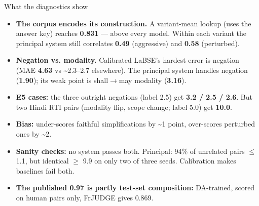 \documentclass[aspectratio=169,11pt]{beamer}
\begin{document}
\begin{frame}{What the diagnostics show}
\footnotesize
\begin{itemize}
\item \textbf{The corpus encodes its construction.} A variant-mean lookup (uses the answer key) reaches \textbf{0.831} — above every model. Within each variant the principal system still correlates \textbf{0.49} (aggressive) and \textbf{0.58} (perturbed).
\item \textbf{Negation vs. modality.} Calibrated LaBSE's hardest error is negation (MAE \textbf{4.63} vs \textasciitilde{}2.3–2.7 elsewhere). The principal system handles negation (\textbf{1.90}); its weak point is shall\ensuremath{\rightarrow}may modality (\textbf{3.16}).
\item \textbf{E5 cases:} the three outright negations (label 2.5) get \textbf{3.2 / 2.5 / 2.6}. But two Hindi RTI pairs (modality flip, scope change; label 5.0) get \textbf{10.0}.
\item \textbf{Bias:} under-scores faithful simplifications by \textasciitilde{}1 point, over-scores perturbed ones by \textasciitilde{}2.
\item \textbf{Sanity checks:} no system passes both. Principal: 94\% of unrelated pairs \ensuremath{\leq} 1.1, but identical \ensuremath{\geq} 9.9 on only two of three seeds. Calibration makes baselines fail both.
\item \textbf{The published 0.97 is partly test-set composition:} DA-trained, scored on human pairs only, FrJUDGE gives 0.869.
\end{itemize}
\end{frame}
\end{document}
